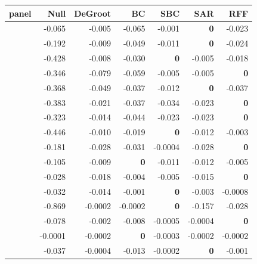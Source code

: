 {\small\setlength{\tabcolsep}{3.5pt}
\begin{tabular}{lrrrrrr}
\toprule
panel & Null & DeGroot & BC & SBC & SAR & RFF \\
\midrule
\adamsLo{} & -0.065 & -0.005 & -0.065 & -0.001 & \textbf{0} & -0.023 \\
\adamsMid{} & -0.192 & -0.009 & -0.049 & -0.011 & \textbf{0} & -0.024 \\
\adamsHi{} & -0.428 & -0.008 & -0.030 & \textbf{0} & -0.005 & -0.018 \\
\takacsCtl{} & -0.346 & -0.079 & -0.059 & -0.005 & -0.005 & \textbf{0} \\
\takacsDis{} & -0.368 & -0.049 & -0.037 & -0.012 & \textbf{0} & -0.037 \\
\takacsInt{} & -0.383 & -0.021 & -0.037 & -0.034 & -0.023 & \textbf{0} \\
\takacsOne{} & -0.323 & -0.014 & -0.044 & -0.023 & -0.023 & \textbf{0} \\
\becker{} & -0.446 & -0.010 & -0.019 & \textbf{0} & -0.012 & -0.003 \\
\vkg{} & -0.181 & -0.028 & -0.031 & -0.0004 & -0.028 & \textbf{0} \\
\vkc{} & -0.105 & -0.009 & \textbf{0} & -0.011 & -0.012 & -0.005 \\
\senate{} & -0.028 & -0.018 & -0.004 & -0.005 & -0.015 & \textbf{0} \\
\house{} & -0.032 & -0.014 & -0.001 & \textbf{0} & -0.003 & -0.0008 \\
\cmv{} & -0.869 & -0.0002 & -0.0002 & \textbf{0} & -0.157 & -0.028 \\
\spinos{} & -0.078 & -0.002 & -0.008 & -0.0005 & -0.0004 & \textbf{0} \\
\kozitsin{} & -0.0001 & -0.0002 & \textbf{0} & -0.0003 & -0.0002 & -0.0002 \\
\markets{} & -0.037 & -0.0004 & -0.013 & -0.0002 & \textbf{0} & -0.001 \\
\bottomrule
\end{tabular}}
\par{}
